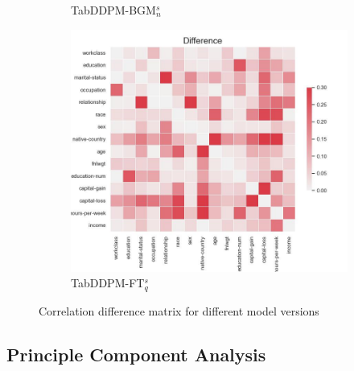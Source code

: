 \begin{figure}[h]
\begin{subfigure}{0.3\textwidth}
        \caption{TabDDPM-BGM$^{s}_n$}
    \end{subfigure}
	\begin{subfigure}{0.3\textwidth}
		\includegraphics[width=\textwidth]{images/correlation_difference/tab-ddpm-ft-simTune.jpg}
		\caption{TabDDPM-FT$^{s}_q$}
    \end{subfigure}
    \caption{Correlation difference matrix for different model versions}
	\label{fig_a:corr_diff}
\end{figure}

\newpage
\subsection[]{Principle Component Analysis}
\label{A:pca}

